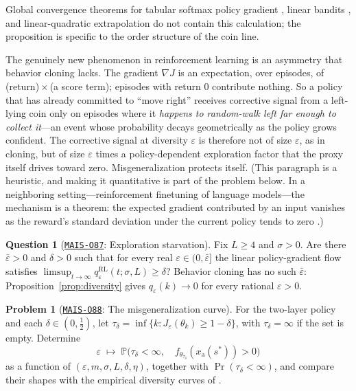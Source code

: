 \documentclass[11pt]{amsart}
\newcommand{\Oid}[1]{\href{https://github.com/lionellevine/MAIS/blob/main/open-problems/MAIS-O#1.md}{\texttt{MAIS-O#1}}}
\theoremstyle{plain}
\theoremstyle{definition}
\newtheorem{problem}[theorem]{Problem}
\newtheorem{question}[theorem]{Question}
\begin{document}
Global convergence theorems for tabular softmax policy gradient \cite{mei2020,agarwal2021}, linear bandits \cite{lin2025}, and linear-quadratic extrapolation \cite{razin2024} do not contain this calculation; the proposition is specific to the order structure of the coin line.

The genuinely new phenomenon in reinforcement learning is an asymmetry that behavior cloning lacks. The gradient $\nabla J$ is an expectation, over episodes, of (return)\,$\times$\,(a score term); episodes with return $0$ contribute nothing. So a policy that has already committed to ``move right'' receives corrective signal from a left-lying coin only on episodes where it \emph{happens to random-walk left far enough to collect it}---an event whose probability decays geometrically as the policy grows confident. The corrective signal at diversity $\varepsilon$ is therefore not of size $\varepsilon$, as in cloning, but of size $\varepsilon$ times a policy-dependent exploration factor that the proxy itself drives toward zero. Misgeneralization protects itself. (This paragraph is a heuristic, and making it quantitative is part of the problem below. In a neighboring setting---reinforcement finetuning of language models---the mechanism is a theorem: the expected gradient contributed by an input vanishes as the reward's standard deviation under the current policy tends to zero \cite{razin2024vanish}.)

\begin{question}[\Oid{87}: Exploration starvation]\label{q:starvation}
Fix $L\ge4$ and $\sigma>0$. Are there $\bar\varepsilon>0$ and $\delta>0$ such that for every real $\varepsilon\in(0,\bar\varepsilon]$ the linear policy-gradient flow satisfies $\limsup_{t\to\infty}q^{\mathrm{RL}}_\varepsilon(t;\sigma,L)\ge\delta$? Behavior cloning has no such $\bar\varepsilon$: Proposition~\ref{prop:diversity} gives $q_\varepsilon(k)\to0$ for every rational $\varepsilon>0$.
\end{question}

\begin{problem}[\Oid{88}: The misgeneralization curve]\label{prob:curve}
For the two-layer policy and each $\delta\in(0,\tfrac12)$, let $\tau_\delta=\inf\{k: J_\varepsilon(\theta_k)\ge1-\delta\}$, with $\tau_\delta=\infty$ if the set is empty. Determine
\[
   \varepsilon\;\longmapsto\;
   \mathbb P\bigl(\tau_\delta<\infty,\quad
   f_{\theta_{\tau_\delta}}(x_{\mathrm a}(s^{*}))>0\bigr)
\]
as a function of $(\varepsilon,m,\sigma,L,\delta,\eta)$, together with $\Pr(\tau_\delta<\infty)$, and compare their shapes with the empirical diversity curves of \cite[\S4.1]{langosco2022}.
\end{problem}
\end{document}
